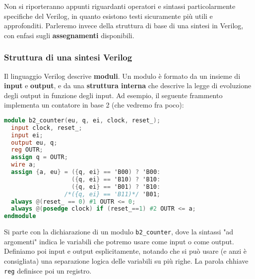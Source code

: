 \documentclass[a4paper,11pt]{article}
\begin{document}

Non si riporteranno appunti riguardanti operatori e sintassi particolarmente specifiche del Verilog, in quanto esistono testi sicuramente più utili e approfonditi.
Parleremo invece della struttura di base di una sintesi in Verilog, con enfasi sugli \textbf{assegnamenti} disponibili.

\subsubsection{Struttura di una sintesi Verilog}
Il linguaggio Verilog descrive \textbf{moduli}.
Un modulo è formato da un insieme di \textbf{input} e \textbf{output}, e da una \textbf{struttura interna} che descrive la legge di evoluzione degli output in funzione degli input.
Ad esempio, il seguente frammento implementa un contatore in base 2 (che vedremo fra poco):
\begin{lstlisting}[language=verilog, style=codestyle]	
module b2_counter(eu, q, ei, clock, reset_);
  input clock, reset_;
  input ei;
  output eu, q;
  reg OUTR;
  assign q = OUTR;	
  wire a;
  assign {a, eu} = ({q, ei} == 'B00) ? 'B00:
                   ({q, ei} == 'B10) ? 'B10:
                   ({q, ei} == 'B01) ? 'B10:
                 /*({q, ei} == 'B11)*/ 'B01;
  always @(reset_ == 0) #1 OUTR <= 0;
  always @(posedge clock) if (reset_==1) #2 OUTR <= a;
endmodule
\end{lstlisting}

Si parte con la dichiarazione di un modulo \lstinline|b2_counter|, dove la sintassi "ad argomenti" indica le variabili che potremo usare come input o come output.
Definiamo poi input e output esplicitamente, notando che si può usare (e anzi è consigliata) una separazione logica delle variabili su più righe.
La parola chhiave \lstinline|reg| definisce poi un registro.
\end{document}
